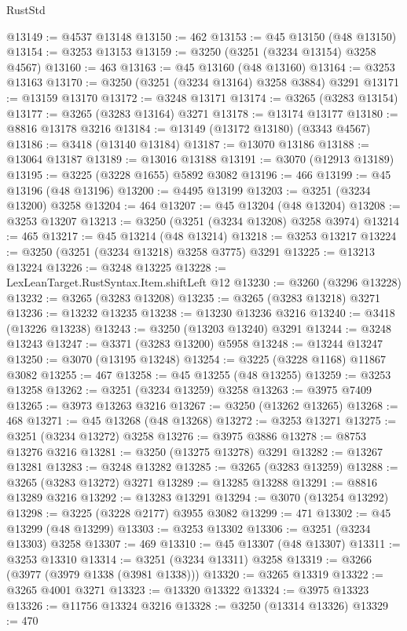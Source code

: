 \begin{lexlean}{RustStd}
\begin{coremodule}
@13149 := @4537 @13148
@13150 := 462
@13153 := @45 @13150 (@48 @13150)
@13154 := @3253 @13153
@13159 := @3250 (@3251 (@3234 @13154) @3258 @4567)
@13160 := 463
@13163 := @45 @13160 (@48 @13160)
@13164 := @3253 @13163
@13170 := @3250 (@3251 (@3234 @13164) @3258 @3884) @3291
@13171 := @13159 @13170
@13172 := @3248 @13171
@13174 := @3265 (@3283 @13154)
@13177 := @3265 (@3283 @13164) @3271
@13178 := @13174 @13177
@13180 := @8816 @13178 @3216
@13184 := @13149 (@13172 @13180) (@3343 @4567)
@13186 := @3418 (@13140 @13184)
@13187 := @13070 @13186
@13188 := @13064 @13187
@13189 := @13016 @13188
@13191 := @3070 (@12913 @13189)
@13195 := @3225 (@3228 @1655) @5892 @3082
@13196 := 466
@13199 := @45 @13196 (@48 @13196)
@13200 := @4495 @13199
@13203 := @3251 (@3234 @13200) @3258
@13204 := 464
@13207 := @45 @13204 (@48 @13204)
@13208 := @3253 @13207
@13213 := @3250 (@3251 (@3234 @13208) @3258 @3974)
@13214 := 465
@13217 := @45 @13214 (@48 @13214)
@13218 := @3253 @13217
@13224 := @3250 (@3251 (@3234 @13218) @3258 @3775) @3291
@13225 := @13213 @13224
@13226 := @3248 @13225
@13228 := LexLeanTarget.RustSyntax.Item.shiftLeft @12
@13230 := @3260 (@3296 @13228)
@13232 := @3265 (@3283 @13208)
@13235 := @3265 (@3283 @13218) @3271
@13236 := @13232 @13235
@13238 := @13230 @13236 @3216
@13240 := @3418 (@13226 @13238)
@13243 := @3250 (@13203 @13240) @3291
@13244 := @3248 @13243
@13247 := @3371 (@3283 @13200) @5958
@13248 := @13244 @13247
@13250 := @3070 (@13195 @13248)
@13254 := @3225 (@3228 @1168) @11867 @3082
@13255 := 467
@13258 := @45 @13255 (@48 @13255)
@13259 := @3253 @13258
@13262 := @3251 (@3234 @13259) @3258
@13263 := @3975 @7409
@13265 := @3973 @13263 @3216
@13267 := @3250 (@13262 @13265)
@13268 := 468
@13271 := @45 @13268 (@48 @13268)
@13272 := @3253 @13271
@13275 := @3251 (@3234 @13272) @3258
@13276 := @3975 @3886
@13278 := @8753 @13276 @3216
@13281 := @3250 (@13275 @13278) @3291
@13282 := @13267 @13281
@13283 := @3248 @13282
@13285 := @3265 (@3283 @13259)
@13288 := @3265 (@3283 @13272) @3271
@13289 := @13285 @13288
@13291 := @8816 @13289 @3216
@13292 := @13283 @13291
@13294 := @3070 (@13254 @13292)
@13298 := @3225 (@3228 @2177) @3955 @3082
@13299 := 471
@13302 := @45 @13299 (@48 @13299)
@13303 := @3253 @13302
@13306 := @3251 (@3234 @13303) @3258
@13307 := 469
@13310 := @45 @13307 (@48 @13307)
@13311 := @3253 @13310
@13314 := @3251 (@3234 @13311) @3258
@13319 := @3266 (@3977 (@3979 @1338 (@3981 @1338)))
@13320 := @3265 @13319
@13322 := @3265 @4001 @3271
@13323 := @13320 @13322
@13324 := @3975 @13323
@13326 := @11756 @13324 @3216
@13328 := @3250 (@13314 @13326)
@13329 := 470

\end{coremodule}
\end{lexlean}
